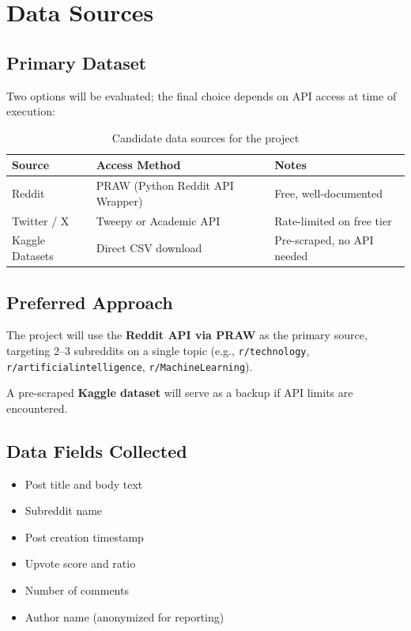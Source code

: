 \documentclass[12pt, letterpaper]{article}
\begin{document}
\section{Data Sources}

\subsection{Primary Dataset}

Two options will be evaluated; the final choice depends on API access at time of execution:

\begin{table}[h!]
\centering
\renewcommand{\arraystretch}{1.4}
\begin{tabular}{@{}lll@{}}
\toprule
\textbf{Source} & \textbf{Access Method} & \textbf{Notes} \\
\midrule
Reddit & PRAW (Python Reddit API Wrapper) & Free, well-documented \\
Twitter / X & Tweepy or Academic API & Rate-limited on free tier \\
Kaggle Datasets & Direct CSV download & Pre-scraped, no API needed \\
\bottomrule
\end{tabular}
\caption{Candidate data sources for the project}
\end{table}

\subsection{Preferred Approach}

The project will use the \textbf{Reddit API via PRAW} as the primary source, targeting 2--3 subreddits on a single topic (e.g., \texttt{r/technology}, \texttt{r/artificialintelligence}, \texttt{r/MachineLearning}).

A pre-scraped \textbf{Kaggle dataset} will serve as a backup if API limits are encountered.

\subsection{Data Fields Collected}

\begin{itemize}[noitemsep]
    \item Post title and body text
    \item Subreddit name
    \item Post creation timestamp
    \item Upvote score and ratio
    \item Number of comments
    \item Author name (anonymized for reporting)
\end{itemize}
\end{document}
